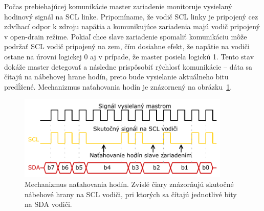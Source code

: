 Počas prebiehajúcej komunikácie master zariadenie monitoruje vysielaný hodinový signál na SCL linke. Pripomíname, že vodič SCL linky je pripojený cez zdvíhací odpor k zdroju napätia a komunikujúce zariadenia majú vodič pripojený v open-drain režime. Pokiaľ chce slave zariadenie spomaliť komunikáciu môže podržať SCL vodič pripojený na zem, čím dosiahne efekt, že napätie na vodiči ostane na úrovni logickej 0 aj v prípade, že master posiela logickú 1. Tento stav dokáže master detegovať a následne prispôsobiť rýchlosť komunikácie -- dáta sa čítajú na nábehovej hrane hodín, preto bude vysielanie aktuálneho bitu predĺžené. Mechanizmus naťahovania hodín je znázornený na obrázku~\ref{obr:i2cStretch}.

\begin{figure}
    \centerline{\includegraphics[width=0.9\textwidth]{images/busses/i2cStretch.pdf}}
    \caption[Mechanizmus naťahovania hodín]{Mechanizmus naťahovania hodín. Zvislé čiary znázorňujú skutočné nábehové hrany na SCL vodiči, pri ktorých sa čítajú jednotlivé bity na SDA vodiči.}
    \label{obr:i2cStretch}
\end{figure}